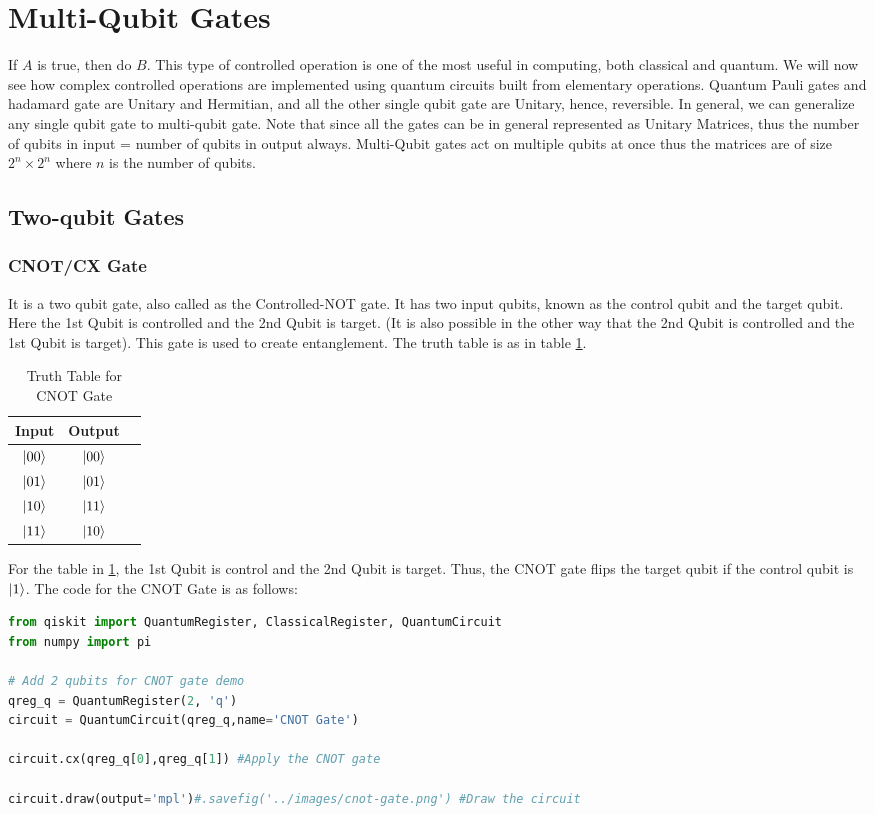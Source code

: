 \section{Multi-Qubit Gates}
If $A$ is true, then do $B$. This type of controlled operation is one of the most useful in computing, both classical and quantum.  We will now see how complex controlled operations are implemented using quantum circuits built from elementary operations.
Quantum Pauli gates and hadamard gate are Unitary and Hermitian, and all the other single qubit gate are Unitary, hence, reversible.
In general, we can generalize any single qubit gate to multi-qubit gate.
Note that since all the gates can be in general represented as Unitary Matrices, thus the number of 
qubits in input = number of qubits in output always. Multi-Qubit gates act on multiple qubits at once thus the matrices are of
size $2^n \times 2^n$ where $n$ is the number of qubits.

\subsection{Two-qubit Gates}
\subsubsection{CNOT/CX Gate}
It is a two qubit gate, also called as the Controlled-NOT gate. It has two input qubits, known as the control qubit and the target qubit.
Here the 1st Qubit is controlled and the 2nd Qubit is target.
(It is also possible in the other way that the 2nd Qubit is controlled and the 1st Qubit is target).
This gate is used to create entanglement.
The truth table is as in table \ref{tab:cnot}.
\begin{table}[ht]
    \centering
    \begin{tabular}{|c|c|c|}
        \hline
        Input & Output\\
        \hline
        $\ket{00}$ & $\ket{00}$\\
        $\ket{01}$   & $\ket{01}$\\
        $\ket{10}$   & $\ket{11}$\\
        $\ket{11}$  & $\ket{10}$\\
        \hline
    \end{tabular}
    \caption{Truth Table for CNOT Gate}
    \label{tab:cnot}
\end{table}
For the table in \ref{tab:cnot}, the 1st Qubit is control and the 2nd Qubit is target.
Thus, the CNOT gate flips the target qubit if the control qubit is $\ket{1}$.
The code for the CNOT Gate is as follows:
\begin{lstlisting}[language=Python]
from qiskit import QuantumRegister, ClassicalRegister, QuantumCircuit
from numpy import pi

# Add 2 qubits for CNOT gate demo
qreg_q = QuantumRegister(2, 'q')
circuit = QuantumCircuit(qreg_q,name='CNOT Gate')

circuit.cx(qreg_q[0],qreg_q[1]) #Apply the CNOT gate

circuit.draw(output='mpl')#.savefig('../images/cnot-gate.png') #Draw the circuit
\end{lstlisting}

